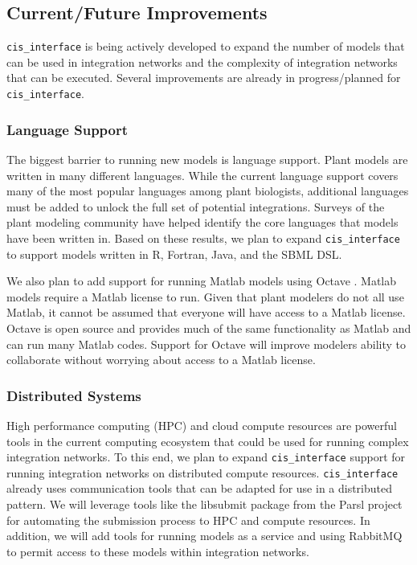 \documentclass[journal]{IEEEtran}
\newcommand{\cis}{{\tt cis\_interface}{}}
\begin{document}
\subsection{Current/Future Improvements}\label{SS:future}
%
{\cis} is being actively developed to expand the number of models 
that can be used in integration networks and the complexity of integration 
networks that can be executed. Several improvements are already in progress/planned for {\cis}.

\subsubsection{Language Support}\label{SS:langsupport}
%
The biggest barrier to running new models is language support. Plant models 
are written in many different languages. While the current language support 
covers many of the most popular languages among plant biologists, 
additional languages must be added to unlock the full set of potential integrations. 
Surveys of the plant modeling community have helped identify the core languages 
that models have been written in. Based on these results, we plan to expand 
{\cis} to support models written in R, Fortran, Java, and the SBML \citep{Hucka2003} DSL.

We also plan to add support for running Matlab models using Octave \citep{Eaton2002}. Matlab 
models require a Matlab license to run. Given that plant modelers do not all 
use Matlab, it cannot be assumed that everyone will have access to a Matlab 
license. Octave is open source and provides much of the same functionality 
as Matlab and can run many Matlab codes. Support for Octave will improve 
modelers ability to collaborate without worrying about access to a Matlab 
license. 

\subsubsection{Distributed Systems}\label{SS:distributed}
%
High performance computing (HPC) and cloud compute resources are powerful 
tools in the current computing ecosystem that could be used for running 
complex integration networks. To this end, we plan to expand {\cis} 
support for running integration networks on distributed compute resources. 
{\cis} already uses communication tools that can be adapted for use 
in a distributed pattern. We will leverage tools like the libsubmit package from the 
Parsl project \citep{babuji18} for 
automating the submission process to HPC and compute resources. In addition, 
we will add tools for running models as a service and using RabbitMQ to 
permit access to these models within integration networks.
\end{document}
